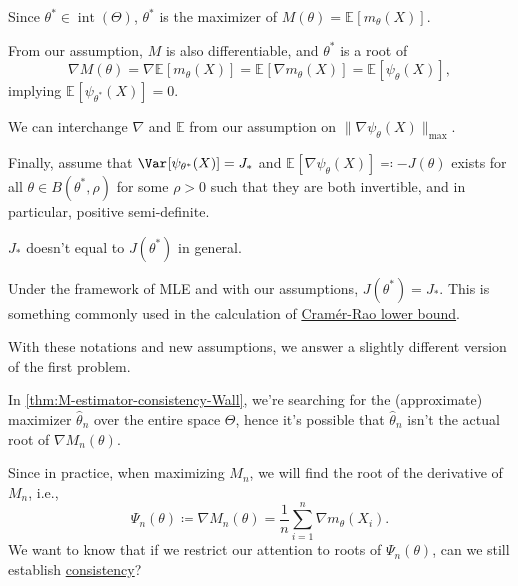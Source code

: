\begin{remark}
	Since \(\theta ^{\ast} \in \operatorname{int}(\Theta ) \), \(\theta ^{\ast} \) is the maximizer of \(M(\theta ) = \mathbb{E}_{}[m_\theta (X)] \).
\end{remark}

From our assumption, \(M\) is also differentiable, and \(\theta ^{\ast} \) is a root of
\[
	\nabla M(\theta )
	= \nabla \mathbb{E}_{}[m_\theta (X)]
	= \mathbb{E}_{}[\nabla m_\theta (X)]
	= \mathbb{E}_{}[\psi _\theta (X)],
\]
implying \(\mathbb{E}_{}[\psi _{\theta ^{\ast} }(X)] = 0\).

\begin{note}
	We can interchange \(\nabla \) and \(\mathbb{E} \) from our assumption on \(\lVert \nabla \psi _\theta (X) \rVert _{\max }\).
\end{note}

Finally, assume that \(\Var_{}[\psi _{\theta ^{\ast} }(X)] = J_{\ast}\) and \(\mathbb{E}_{}[\nabla \psi _\theta (X)] \eqqcolon - J(\theta )\) exists for all \(\theta \in B(\theta ^{\ast} , \rho )\) for some \(\rho > 0\) such that they are both invertible, and in particular, positive semi-definite.

\begin{note}
	\(J_{\ast}\) doesn't equal to \(J(\theta ^{\ast} )\) in general.
\end{note}

\begin{eg}
	Under the framework of MLE and with our assumptions, \(J(\theta ^{\ast} ) = J_{\ast}\). This is something commonly used in the calculation of \href{https://en.wikipedia.org/wiki/Cram%C3%A9r%E2%80%93Rao_bound}{Cramér-Rao lower bound}.
\end{eg}

With these notations and new assumptions, we answer a slightly different version of the first problem.

\begin{prev}
	In \autoref{thm:M-estimator-consistency-Wall}, we're searching for the (approximate) maximizer \(\hat{\theta} _n\) over the entire space \(\Theta \), hence it's possible that \(\hat{\theta} _n\) isn't the actual root of \(\nabla M_n(\theta )\).
\end{prev}

Since in practice, when maximizing \(M_n\), we will find the root of the derivative of \(M_n\), i.e.,
\[
	\Psi _n(\theta )
	\coloneqq \nabla M_n(\theta )
	= \frac{1}{n}\sum_{i=1}^{n} \nabla m_{\theta }(X_i).
\]
We want to know that if we restrict our attention to roots of \(\Psi _n(\theta )\), can we still establish \hyperref[def:consistent]{consistency}?

